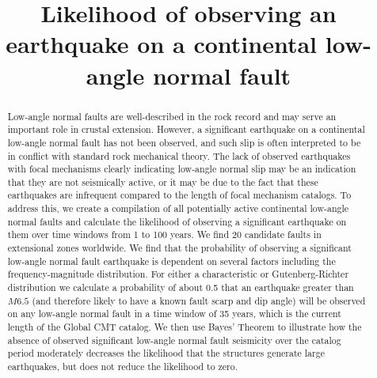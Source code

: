 \documentclass[draft,grl]{AGUTeX}
\begin{document}
\title{Likelihood of observing an earthquake on a continental 
	   low-angle normal fault}



\begin{abstract}
Low-angle normal faults are well-described in the rock record and may serve an
important role in crustal extension.  However, a significant earthquake on
a continental low-angle normal fault has not been observed, and such slip is
often interpreted to be in conflict with standard rock mechanical theory. The
lack of observed earthquakes with focal mechanisms clearly indicating low-angle
normal slip may be an indication that they are not seismically active, or it
may be due to the fact that these earthquakes are infrequent compared to the
length of focal mechanism catalogs. To address this, we create a compilation of
all potentially active continental low-angle normal faults and calculate the
likelihood of observing a significant earthquake on them over time windows from
1 to 100 years. We find 20 candidate faults in extensional zones worldwide.  We
find that the probability of observing a significant low-angle normal fault
earthquake is dependent on several factors including the frequency-magnitude
distribution. For either a characteristic or Gutenberg-Richter distribution we
calculate a probability of about 0.5 that an earthquake greater than $M6.5$
(and therefore likely to have a known fault scarp and dip angle) will be
observed on any low-angle normal fault in a time window of 35 years, which is
the current length of the Global CMT catalog. We then use Bayes' Theorem to
illustrate how the absence of observed significant low-angle normal fault
seismicity over the catalog period moderately decreases the likelihood that the
structures generate large earthquakes, but does not reduce the likelihood to
zero.


\end{abstract}
\end{document}
